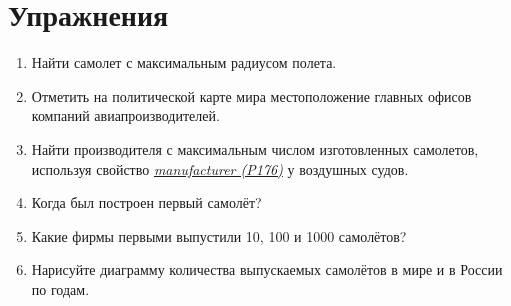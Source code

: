 




\section{Упражнения}%


\begin{enumerate}
\item Найти самолет с максимальным радиусом полета.
\item Отметить на политической карте мира местоположение главных офисов компаний авиапроизводителей.
\item Найти производителя с максимальным числом изготовленных самолетов, используя свойство \href{https://w.wiki/vF7}{\textit{manufacturer (P176)}} у воздушных судов.
\item Когда был построен первый самолёт?
\item Какие фирмы первыми выпустили 10, 100 и 1000 самолётов?
\item Нарисуйте диаграмму количества выпускаемых самолётов в мире и в России по годам.
\end{enumerate}

